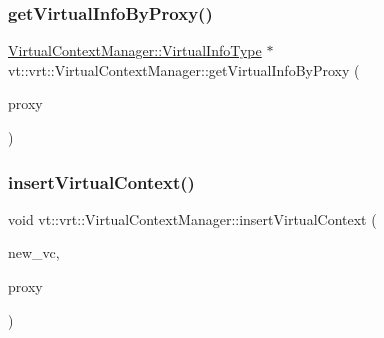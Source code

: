 \mbox{\label{structvt_1_1vrt_1_1_virtual_context_manager_a5f81b9f6d2a629c27c6c2c973005487d}} 
\subsubsection{\texorpdfstring{get\+Virtual\+Info\+By\+Proxy()}{getVirtualInfoByProxy()}}
{\footnotesize\ttfamily \hyperlink{structvt_1_1vrt_1_1_virtual_context_manager_ad2cd828dbd8886166b4ceb3776c49239}{Virtual\+Context\+Manager\+::\+Virtual\+Info\+Type} $\ast$ vt\+::vrt\+::\+Virtual\+Context\+Manager\+::get\+Virtual\+Info\+By\+Proxy (\begin{DoxyParamCaption}\item[{\hyperlink{namespacevt_a1b417dd5d684f045bb58a0ede70045ac}{Virtual\+Proxy\+Type} const \&}]{proxy }\end{DoxyParamCaption})}

\mbox{\label{structvt_1_1vrt_1_1_virtual_context_manager_a398fd80620aad8ff9ba5fa9964a661a6}} 
\subsubsection{\texorpdfstring{insert\+Virtual\+Context()}{insertVirtualContext()}}
{\footnotesize\ttfamily void vt\+::vrt\+::\+Virtual\+Context\+Manager\+::insert\+Virtual\+Context (\begin{DoxyParamCaption}\item[{typename \hyperlink{structvt_1_1vrt_1_1_virtual_context_manager_a24dd2acbbd37a53f4e4108d385a58441}{Virtual\+Context\+Manager\+::\+Virtual\+Ptr\+Type}}]{new\+\_\+vc,  }\item[{\hyperlink{namespacevt_a1b417dd5d684f045bb58a0ede70045ac}{Virtual\+Proxy\+Type}}]{proxy }\end{DoxyParamCaption})\hspace{0.3cm}{\ttfamily [private]}}

